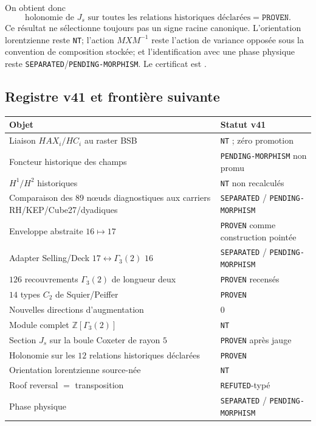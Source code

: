 \documentclass[11pt,a4paper]{article}
\newcommand{\certProven}{\texttt{PROVEN}}
\newcommand{\certRefuted}{\texttt{REFUTED}}
\newcommand{\certSeparated}{\texttt{SEPARATED}}
\newcommand{\certPending}{\texttt{PENDING-MORPHISM}}
\newcommand{\certNT}{\texttt{NT}}
\begin{document}
On obtient donc
\[
 \boxed{
 \text{holonomie de }J_s\text{ sur toutes les relations historiques déclarées}
 =\texttt{PROVEN}.}
\]
Ce résultat ne sélectionne toujours pas un signe racine canonique. L'orientation lorentzienne reste \certNT; l'action $MXM^{-1}$ reste l'action de variance opposée sous la convention de composition stockée; et l'identification avec une phase physique reste \certSeparated/\certPending. Le certificat est .

\subsection{Registre v41 et frontière suivante}

\begin{center}
\begin{tabularx}{\textwidth}{@{}Xl@{}}
\toprule
Objet & Statut v41\\
\midrule
Liaison $HAX_i/HC_i$ au raster BSB & \certNT{} ; zéro promotion\\
Foncteur historique des champs & \certPending{} non promu\\
$H^1/H^2$ historiques & \certNT{} non recalculés\\
Comparaison des $89$ nœuds diagnostiques aux carriers RH/KEP/Cube27/dyadiques & \certSeparated{} / \certPending\\
Enveloppe abstraite $16\mapsto17$ & \certProven{} comme construction pointée\\
Adapter Selling/Deck $17\leftrightarrow\Gamma_3(2)$ $16$ & \certSeparated{} / \certPending\\
$126$ recouvrements $\Gamma_3(2)$ de longueur deux & \certProven{} recensés\\
$14$ types $C_2$ de Squier/Peiffer & \certProven\\
Nouvelles directions d'augmentation & $0$\\
Module complet $\mathbb Z[\Gamma_3(2)]$ & \certNT\\
Section $J_s$ sur la boule Coxeter de rayon $5$ & \certProven{} après jauge\\
Holonomie sur les $12$ relations historiques déclarées & \certProven\\
Orientation lorentzienne source-née & \certNT\\
Roof reversal $=$ transposition & \certRefuted{}-typé\\
Phase physique & \certSeparated{} / \certPending\\
\bottomrule
\end{tabularx}
\end{center}
\end{document}
